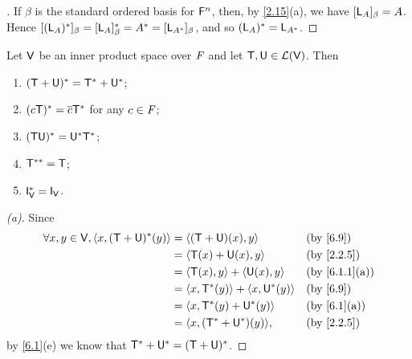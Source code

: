 \begin{proof}[]
  If \(\beta\) is the standard ordered basis for \(\mathsf{F}^n\), then, by \cref{2.15}(a), we have \([\mathsf{L}_A]_{\beta} = A\).
  Hence \([(\mathsf{L}_A)^*]_{\beta} = [\mathsf{L}_A]_{\beta}^* = A^* = [\mathsf{L}_{A^*}]_{\beta}\), and so \((\mathsf{L}_A)^* = \mathsf{L}_{A^*}\).
\end{proof}

\begin{thm}\label{6.11}
  Let \(\mathsf{V}\) be an inner product space over \(\mathit{F}\) and let \(\mathsf{T}, \mathsf{U} \in \mathcal{L}(\mathsf{V})\).
  Then
  \begin{enumerate}
    \item \((\mathsf{T} + \mathsf{U})^* = \mathsf{T}^* + \mathsf{U}^*\);
    \item \((c \mathsf{T})^* = \overline{c} \mathsf{T}^*\) for any \(c \in \mathit{F}\);
    \item \((\mathsf{T} \mathsf{U})^* = \mathsf{U}^* \mathsf{T}^*\);
    \item \(\mathsf{T}^{**} = \mathsf{T}\);
    \item \(\IT[\V]^* = \IT[\V]\).
  \end{enumerate}
\end{thm}

\begin{proof}[(a)]
  Since
  \begin{align*}
    \forall x, y \in \V, \inn{x, (\T + \U)^*(y)} & = \inn{(\T + \U)(x), y}               &  & \by{6.9}      \\
                                                 & = \inn{\T(x) + \U(x), y}              &  & \by{2.2.5}    \\
                                                 & = \inn{\T(x), y} + \inn{\U(x), y}     &  & \by{6.1.1}[a] \\
                                                 & = \inn{x, \T^*(y)} + \inn{x, \U^*(y)} &  & \by{6.9}      \\
                                                 & = \inn{x, \T^*(y) + \U^*(y)}          &  & \by{6.1}[a]   \\
                                                 & = \inn{x, (\T^* + \U^*)(y)},          &  & \by{2.2.5}
  \end{align*}
  by \cref{6.1}(e) we know that \(\mathsf{T}^* + \mathsf{U}^* = (\mathsf{T} + \mathsf{U})^*\).
\end{proof}

